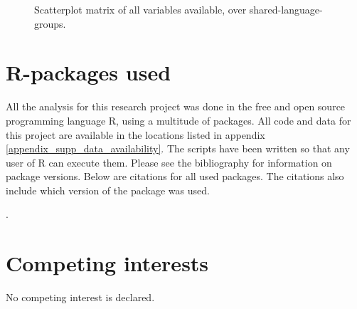 \documentclass[12pt,letterpaper]{article}
\begin{document}
\begin{figure}[ht]
\centering
\caption{Scatterplot matrix of all variables available, over shared-language-groups.}
\label{appendix_SPLOM_medium_all_variables}
\end{figure}



\FloatBarrier

\section{R-packages used}
\label{appendix_r_packages}

All the analysis for this research project was done in the free and open source programming language R, using a multitude of packages. All code and data for this project are available in the locations listed in appendix \ref{appendix_supp_data_availability}. The scripts have been written so that any user of R can execute them. Please see the bibliography for information on package versions. Below are citations for all used packages. The citations also include which version of the package was used.

.


\section{Competing interests}
No competing interest is declared.




\end{document}
